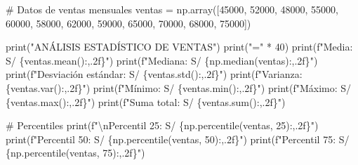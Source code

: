 \documentclass[
  doc,
  floatsintext,
  longtable,
  a4paper,
  nolmodern,
  notxfonts,
  notimes,
  12pt,
  colorlinks=true,linkcolor=blue,citecolor=blue,urlcolor=blue]{apa7}
\newenvironment{Shaded}{\begin{snugshade}}{\end{snugshade}}
\newcommand{\BuiltInTok}[1]{\textcolor[rgb]{0.00,0.23,0.31}{#1}}
\newcommand{\CharTok}[1]{\textcolor[rgb]{0.13,0.47,0.30}{#1}}
\newcommand{\CommentTok}[1]{\textcolor[rgb]{0.37,0.37,0.37}{#1}}
\newcommand{\DecValTok}[1]{\textcolor[rgb]{0.68,0.00,0.00}{#1}}
\newcommand{\NormalTok}[1]{\textcolor[rgb]{0.00,0.23,0.31}{#1}}
\newcommand{\OperatorTok}[1]{\textcolor[rgb]{0.37,0.37,0.37}{#1}}
\newcommand{\SpecialCharTok}[1]{\textcolor[rgb]{0.37,0.37,0.37}{#1}}
\newcommand{\SpecialStringTok}[1]{\textcolor[rgb]{0.13,0.47,0.30}{#1}}
\newcommand{\StringTok}[1]{\textcolor[rgb]{0.13,0.47,0.30}{#1}}
\begin{document}
\begin{Shaded}
\begin{Highlighting}[]
\CommentTok{\# Datos de ventas mensuales}
\NormalTok{ventas }\OperatorTok{=}\NormalTok{ np.array([}\DecValTok{45000}\NormalTok{, }\DecValTok{52000}\NormalTok{, }\DecValTok{48000}\NormalTok{, }\DecValTok{55000}\NormalTok{, }\DecValTok{60000}\NormalTok{, }\DecValTok{58000}\NormalTok{, }
                   \DecValTok{62000}\NormalTok{, }\DecValTok{59000}\NormalTok{, }\DecValTok{65000}\NormalTok{, }\DecValTok{70000}\NormalTok{, }\DecValTok{68000}\NormalTok{, }\DecValTok{75000}\NormalTok{])}

\BuiltInTok{print}\NormalTok{(}\StringTok{"ANÁLISIS ESTADÍSTICO DE VENTAS"}\NormalTok{)}
\BuiltInTok{print}\NormalTok{(}\StringTok{"="} \OperatorTok{*} \DecValTok{40}\NormalTok{)}
\BuiltInTok{print}\NormalTok{(}\SpecialStringTok{f"Media: S/ }\SpecialCharTok{\{}\NormalTok{ventas}\SpecialCharTok{.}\NormalTok{mean()}\SpecialCharTok{:,.2f\}}\SpecialStringTok{"}\NormalTok{)}
\BuiltInTok{print}\NormalTok{(}\SpecialStringTok{f"Mediana: S/ }\SpecialCharTok{\{}\NormalTok{np}\SpecialCharTok{.}\NormalTok{median(ventas)}\SpecialCharTok{:,.2f\}}\SpecialStringTok{"}\NormalTok{)}
\BuiltInTok{print}\NormalTok{(}\SpecialStringTok{f"Desviación estándar: S/ }\SpecialCharTok{\{}\NormalTok{ventas}\SpecialCharTok{.}\NormalTok{std()}\SpecialCharTok{:,.2f\}}\SpecialStringTok{"}\NormalTok{)}
\BuiltInTok{print}\NormalTok{(}\SpecialStringTok{f"Varianza: }\SpecialCharTok{\{}\NormalTok{ventas}\SpecialCharTok{.}\NormalTok{var()}\SpecialCharTok{:,.2f\}}\SpecialStringTok{"}\NormalTok{)}
\BuiltInTok{print}\NormalTok{(}\SpecialStringTok{f"Mínimo: S/ }\SpecialCharTok{\{}\NormalTok{ventas}\SpecialCharTok{.}\BuiltInTok{min}\NormalTok{()}\SpecialCharTok{:,.2f\}}\SpecialStringTok{"}\NormalTok{)}
\BuiltInTok{print}\NormalTok{(}\SpecialStringTok{f"Máximo: S/ }\SpecialCharTok{\{}\NormalTok{ventas}\SpecialCharTok{.}\BuiltInTok{max}\NormalTok{()}\SpecialCharTok{:,.2f\}}\SpecialStringTok{"}\NormalTok{)}
\BuiltInTok{print}\NormalTok{(}\SpecialStringTok{f"Suma total: S/ }\SpecialCharTok{\{}\NormalTok{ventas}\SpecialCharTok{.}\BuiltInTok{sum}\NormalTok{()}\SpecialCharTok{:,.2f\}}\SpecialStringTok{"}\NormalTok{)}

\CommentTok{\# Percentiles}
\BuiltInTok{print}\NormalTok{(}\SpecialStringTok{f"}\CharTok{\textbackslash{}n}\SpecialStringTok{Percentil 25: S/ }\SpecialCharTok{\{}\NormalTok{np}\SpecialCharTok{.}\NormalTok{percentile(ventas, }\DecValTok{25}\NormalTok{)}\SpecialCharTok{:,.2f\}}\SpecialStringTok{"}\NormalTok{)}
\BuiltInTok{print}\NormalTok{(}\SpecialStringTok{f"Percentil 50: S/ }\SpecialCharTok{\{}\NormalTok{np}\SpecialCharTok{.}\NormalTok{percentile(ventas, }\DecValTok{50}\NormalTok{)}\SpecialCharTok{:,.2f\}}\SpecialStringTok{"}\NormalTok{)}
\BuiltInTok{print}\NormalTok{(}\SpecialStringTok{f"Percentil 75: S/ }\SpecialCharTok{\{}\NormalTok{np}\SpecialCharTok{.}\NormalTok{percentile(ventas, }\DecValTok{75}\NormalTok{)}\SpecialCharTok{:,.2f\}}\SpecialStringTok{"}\NormalTok{)}
\end{Highlighting}
\end{Shaded}
\end{document}

